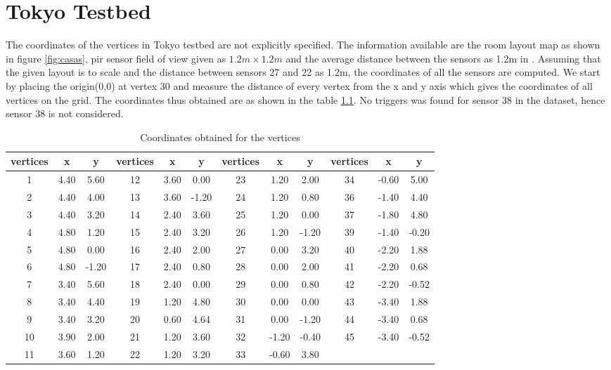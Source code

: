 \chapter{Tokyo Testbed}
\label{app:B}

The coordinates of the vertices in Tokyo testbed are not explicitly specified. The information available are the room layout map as shown in figure \ref{fig:casas}, pir sensor field of view given as $1.2m \times 1.2m$ and the average distance between the sensors as 1.2m in \cite{crandall2011tracking}. Assuming that the given layout is to scale and the distance between sensors 27 and 22 as 1.2m, the coordinates of all the sensors are computed. We start by placing the origin(0,0) at vertex 30 and measure the distance of every vertex from the x and y axis which gives the coordinates of all vertices on the grid. The coordinates thus obtained are as shown in the table \ref{tab:wsuxy}. No triggers was found for sensor 38 in the dataset, hence sensor 38 is not considered.


\begin{table}[]
\centering
\caption{Coordinates obtained for the vertices}
\label{tab:wsuxy}
\begin{tabular}{|c|c|c|c|c|c|c|c|c|c|c|c|}
\hline
vertices & x    & y     & vertices & x    & y     & vertices & x     & y     & vertices & x     & y     \\ \hline
1        & 4.40 & 5.60  & 12       & 3.60 & 0.00  & 23       & 1.20  & 2.00  & 34       & -0.60 & 5.00  \\ \hline
2        & 4.40 & 4.00  & 13       & 3.60 & -1.20 & 24       & 1.20  & 0.80  & 36       & -1.40 & 4.40  \\ \hline
3        & 4.40 & 3.20  & 14       & 2.40 & 3.60  & 25       & 1.20  & 0.00  & 37       & -1.80 & 4.80  \\ \hline
4        & 4.80 & 1.20  & 15       & 2.40 & 3.20  & 26       & 1.20  & -1.20 & 39       & -1.40 & -0.20 \\ \hline
5        & 4.80 & 0.00  & 16       & 2.40 & 2.00  & 27       & 0.00  & 3.20  & 40       & -2.20 & 1.88  \\ \hline
6        & 4.80 & -1.20 & 17       & 2.40 & 0.80  & 28       & 0.00  & 2.00  & 41       & -2.20 & 0.68  \\ \hline
7        & 3.40 & 5.60  & 18       & 2.40 & 0.00  & 29       & 0.00  & 0.80  & 42       & -2.20 & -0.52 \\ \hline
8        & 3.40 & 4.40  & 19       & 1.20 & 4.80  & 30       & 0.00  & 0.00  & 43       & -3.40 & 1.88  \\ \hline
9        & 3.40 & 3.20  & 20       & 0.60 & 4.64  & 31       & 0.00  & -1.20 & 44       & -3.40 & 0.68  \\ \hline
10       & 3.90 & 2.00  & 21       & 1.20 & 3.60  & 32       & -1.20 & -0.40 & 45       & -3.40 & -0.52 \\ \hline
11       & 3.60 & 1.20  & 22       & 1.20 & 3.20  & 33       & -0.60 & 3.80  &          &       &       \\ \hline
\end{tabular}
\end{table}




